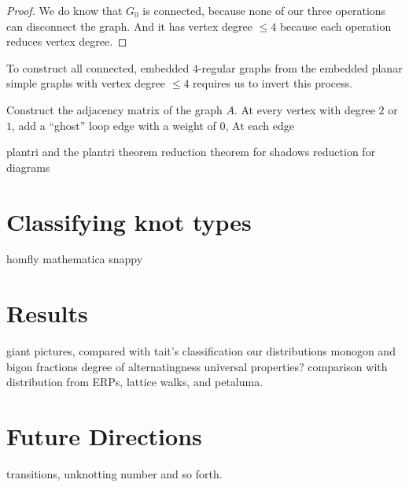 \documentclass[amsmath,secnumarabic,floatfix,amssymb,nofootinbib,nobibnotes,letterpaper,11pt,tightenlines,showkeys]{revtex4}
\theoremstyle{definition}
\begin{document}
\begin{proof}
We do know that $G_0$ is connected, because none of our three operations can disconnect the graph. And it has vertex degree $\leq 4$ because each operation reduces vertex degree.
\end{proof}

To construct all connected, embedded $4$-regular graphs from the embedded planar simple graphs with vertex degree $\leq 4$ requires us to invert this process.

 Construct the adjacency matrix of the graph $A$. At every vertex with degree $2$ or $1$, add a ``ghost'' loop edge with a weight of $0$,  At each edge 

plantri and the plantri theorem
reduction theorem for shadows
reduction for diagrams



\section{Classifying knot types}

homfly
mathematica
snappy

\section{Results}

giant pictures, compared with tait's classification
our distributions
monogon and bigon fractions
degree of alternatingness
universal properties? comparison with distribution from ERPs, lattice walks, and petaluma.

\section{Future Directions}

transitions, unknotting number and so forth.
\end{document}
